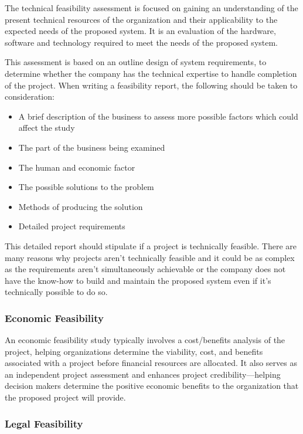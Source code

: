 \documentclass[
]{book}
\providecommand{\tightlist}{%
  \setlength{\itemsep}{0pt}\setlength{\parskip}{0pt}}
\begin{document}
The technical feasibility assessment is focused on gaining an understanding of the present technical resources of the organization and their applicability to the expected needs of the proposed system. It is an evaluation of the hardware, software and technology required to meet the needs of the proposed system.

This assessment is based on an outline design of system requirements, to determine whether the company has the technical expertise to handle completion of the project. When writing a feasibility report, the following should be taken to consideration:

\begin{itemize}
\tightlist
\item
  A brief description of the business to assess more possible factors which could affect the study
\item
  The part of the business being examined
\item
  The human and economic factor
\item
  The possible solutions to the problem
\item
  Methods of producing the solution
\item
  Detailed project requirements
\end{itemize}

This detailed report should stipulate if a project is technically feasible. There are many reasons why projects aren't technically feasible and it could be as complex as the requirements aren't simultaneously achievable or the company does not have the know-how to build and maintain the proposed system even if it's technically possible to do so.

\hypertarget{economic-feasibility}{%
\subsubsection{Economic Feasibility}\label{economic-feasibility}}

An economic feasibility study typically involves a cost/benefits analysis of the project, helping organizations determine the viability, cost, and benefits associated with a project before financial resources are allocated. It also
serves as an independent project assessment and enhances project
credibility---helping decision makers determine the positive economic benefits to the organization that the proposed project will provide.

\hypertarget{legal-feasibility}{%
\subsubsection{Legal Feasibility}\label{legal-feasibility}}
\end{document}
